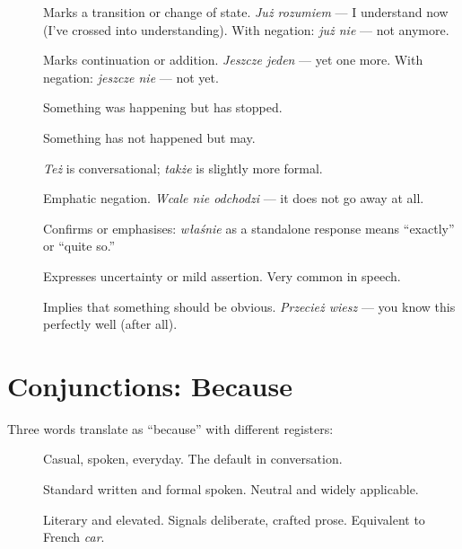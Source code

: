 \begin{description}
  \item[] Marks a transition or 
    change of state. \textit{Już rozumiem} — I understand now (I've crossed 
    into understanding). With negation: \textit{już nie} — not anymore.
  \item[] Marks continuation 
    or addition. \textit{Jeszcze jeden} — yet one more. With negation: 
    \textit{jeszcze nie} — not yet.
  \item[] Something was happening but has stopped.
  \item[] Something has not happened but may.
  \item[] \textit{Też} is conversational; 
    \textit{także} is slightly more formal.
  \item[] Emphatic negation. 
    \textit{Wcale nie odchodzi} — it does not go away at all.
  \item[] 
    Confirms or emphasises: \textit{właśnie} as a standalone response 
    means ``exactly'' or ``quite so.''
  \item[] Expresses 
    uncertainty or mild assertion. Very common in speech.
  \item[] Implies that 
    something should be obvious. \textit{Przecież wiesz} — you know 
    this perfectly well (after all).
\end{description}

\section{Conjunctions: Because}

Three words translate as ``because'' with different registers:

\begin{description}
  \item[] Casual, spoken, everyday. 
    The default in conversation.
  \item[] Standard written and formal spoken. 
    Neutral and widely applicable.
  \item[] Literary and elevated. 
    Signals deliberate, crafted prose. Equivalent to French \textit{car}.
\end{description}

